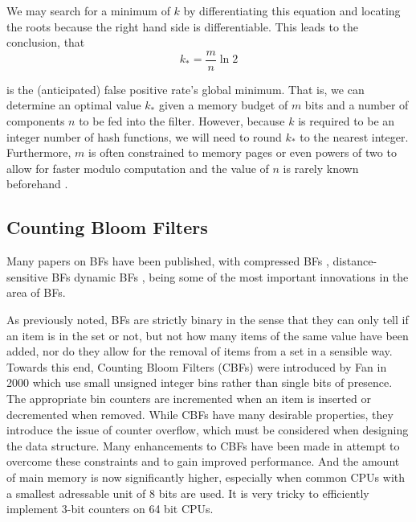 \documentclass[sigconf, nonacm]{acmart}
\begin{document}
We may search for a minimum of $k$ by differentiating this equation and locating the roots because the right hand side is differentiable. This leads to the conclusion, that
\begin{equation}
  k_{*} = \frac{m}{n} \ln{2}
\end{equation}

is the (anticipated) false positive rate's global minimum. That is, we can determine an optimal value $k_{*}$ given a memory budget of $m$ bits and a number of components $n$ to be fed into the filter. However, because $k$ is required to be an integer number of hash functions, we will need to round $k_{*}$ to the nearest integer. Furthermore, $m$ is often constrained to memory pages or even powers of two to allow for faster modulo computation and the value of $n$ is rarely known beforehand \cite{broder2004network}.



\subsection{Counting Bloom Filters}\label{section:cbf}
Many papers on BFs have been published, with compressed BFs \cite{mitzenmacher2002compressed}, distance-sensitive BFs \cite{kirsch2006distance} dynamic BFs \cite{guo2009dynamic}, being some of the most important innovations in the area of BFs.

As previously noted, BFs are strictly binary in the sense that they can only tell if an item is in the set or not, but not how many items of the same value have been added, nor do they allow for the removal of items from a set in a sensible way. Towards this end, Counting Bloom Filters (CBFs) were introduced by Fan in 2000 \cite{fan2000summary} which use small unsigned integer bins rather than single bits of presence. The appropriate bin counters are incremented when an item is inserted or decremented when removed.
While CBFs have many desirable properties, they introduce the issue of counter overflow, which must be considered when designing the data structure. Many enhancements to CBFs have been made in attempt to overcome these constraints and to gain improved performance. And the amount of main memory is now significantly higher, especially when common CPUs with a smallest adressable unit of 8 bits are used. It is very tricky to efficiently implement 3-bit counters on 64 bit CPUs.
\end{document}
